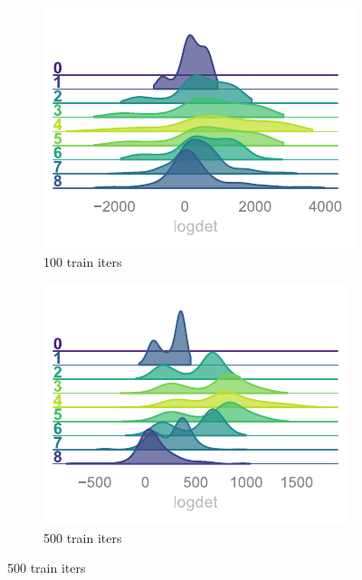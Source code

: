 \documentclass[a4paper,11pt]{article}
\begin{document}
\begin{figure}[htpb!]
    \centering
    \begin{subfigure}{0.31\textwidth}
        \includegraphics[width=\textwidth]{assets/logdet-1.pdf}
        \caption{\label{subfig:logdet1} 100 train iters}
    \end{subfigure}
    \hfill
    \begin{subfigure}{0.31\textwidth}
        \includegraphics[width=\textwidth]{assets/logdet-2.pdf}
        \caption{\label{subfig:logdet2} 500 train iters}

\end{subfigure}
\end{figure}
\end{document}
